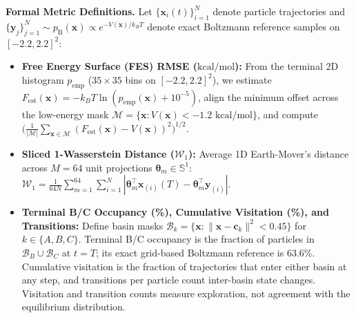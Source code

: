 \documentclass{article}
\begin{document}
\textbf{Formal Metric Definitions.} Let $\{\mathbf{x}_i(t)\}_{i=1}^N$ denote particle trajectories and $\{\mathbf{y}_j\}_{j=1}^N \sim p_{\text{B}}(\mathbf{x}) \propto e^{-V(\mathbf{x})/k_B T}$ denote exact Boltzmann reference samples on $[-2.2, 2.2]^2$:
\begin{itemize}
    \item \textbf{Free Energy Surface (FES) RMSE ($\text{kcal/mol}$):} From the terminal 2D histogram $p_{\text{emp}}$ ($35\times 35$ bins on $[-2.2, 2.2]^2$), we estimate $F_{\text{est}}(\mathbf{x}) = -k_B T \ln(p_{\text{emp}}(\mathbf{x}) + 10^{-5})$, align the minimum offset across the low-energy mask $\mathcal{M} = \{\mathbf{x} : V(\mathbf{x}) < -1.2\text{ kcal/mol}\}$, and compute $\bigl(\frac{1}{|\mathcal{M}|}\sum_{\mathbf{x}\in\mathcal{M}} (F_{\text{est}}(\mathbf{x}) - V(\mathbf{x}))^2\bigr)^{1/2}$.
    \item \textbf{Sliced 1-Wasserstein Distance ($\mathcal{W}_1$):} Average 1D Earth-Mover's distance across $M=64$ unit projections $\boldsymbol{\theta}_m \in \mathbb{S}^1$: $\mathcal{W}_1 = \frac{1}{64N}\sum_{m=1}^{64}\sum_{i=1}^N |\boldsymbol{\theta}_m^\top \mathbf{x}_{(i)}(T) - \boldsymbol{\theta}_m^\top \mathbf{y}_{(i)}|$.
    \item \textbf{Terminal B/C Occupancy (\%), Cumulative Visitation (\%), and Transitions:} Define basin masks $\mathcal{B}_k = \{\mathbf{x} : \|\mathbf{x} - \mathbf{c}_k\|^2 < 0.45\}$ for $k \in \{A, B, C\}$. Terminal B/C occupancy is the fraction of particles in $\mathcal{B}_B \cup \mathcal{B}_C$ at $t=T$; its exact grid-based Boltzmann reference is $63.6\%$. Cumulative visitation is the fraction of trajectories that enter either basin at any step, and transitions per particle count inter-basin state changes. Visitation and transition counts measure exploration, not agreement with the equilibrium distribution.
\end{itemize}
\end{document}
